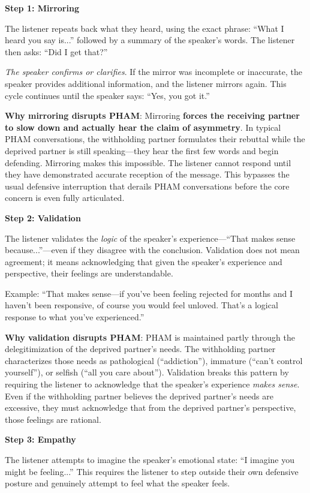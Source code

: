 \documentclass[12pt, letterpaper]{article}
\begin{document}
\textbf{Step 1: Mirroring}

The listener repeats back what they heard, using the exact phrase: ``What I heard you say is...'' followed by a summary of the speaker's words. The listener then asks: ``Did I get that?''

\textit{The speaker confirms or clarifies}. If the mirror was incomplete or inaccurate, the speaker provides additional information, and the listener mirrors again. This cycle continues until the speaker says: ``Yes, you got it.''

\textbf{Why mirroring disrupts PHAM}: Mirroring \textbf{forces the receiving partner to slow down and actually hear the claim of asymmetry}. In typical PHAM conversations, the withholding partner formulates their rebuttal while the deprived partner is still speaking---they hear the first few words and begin defending. Mirroring makes this impossible. The listener cannot respond until they have demonstrated accurate reception of the message. This bypasses the usual defensive interruption that derails PHAM conversations before the core concern is even fully articulated.

\textbf{Step 2: Validation}

The listener validates the \textit{logic} of the speaker's experience---``That makes sense because...''---even if they disagree with the conclusion. Validation does not mean agreement; it means acknowledging that given the speaker's experience and perspective, their feelings are understandable.

Example: ``That makes sense---if you've been feeling rejected for months and I haven't been responsive, of course you would feel unloved. That's a logical response to what you've experienced.''

\textbf{Why validation disrupts PHAM}: PHAM is maintained partly through the delegitimization of the deprived partner's needs. The withholding partner characterizes those needs as pathological (``addiction''), immature (``can't control yourself''), or selfish (``all you care about''). Validation breaks this pattern by requiring the listener to acknowledge that the speaker's experience \textit{makes sense}. Even if the withholding partner believes the deprived partner's needs are excessive, they must acknowledge that from the deprived partner's perspective, those feelings are rational.

\textbf{Step 3: Empathy}

The listener attempts to imagine the speaker's emotional state: ``I imagine you might be feeling...'' This requires the listener to step outside their own defensive posture and genuinely attempt to feel what the speaker feels.
\end{document}
